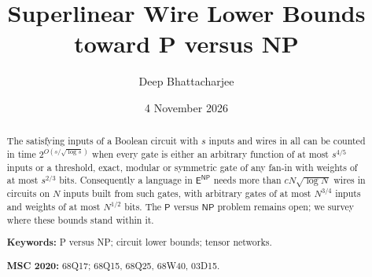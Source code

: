 \documentclass[11pt,reqno]{amsart}
\title[Superlinear wire lower bounds]{Superlinear Wire Lower Bounds toward P versus NP}
\author{Deep Bhattacharjee}
\date{4 November 2026}
\numberwithin{equation}{section}
\theoremstyle{plain}
\theoremstyle{definition}
\theoremstyle{remark}
\newcommand{\Pc}{\mathsf{P}}
\newcommand{\NP}{\mathsf{NP}}
\newcommand{\ENP}{\mathsf{E}^{\mathsf{NP}}}
\begin{document}
\begin{abstract}
The satisfying inputs of a Boolean circuit with $s$ inputs and wires in all
can be counted in time $2^{O(s/\sqrt{\log s})}$ when every gate is either an
arbitrary function of at most $s^{4/5}$ inputs or a threshold, exact, modular or
symmetric gate of any fan-in with weights of at most $s^{2/3}$ bits.
Consequently a language in $\ENP$ needs more than $cN\sqrt{\log N}$ wires in
circuits on $N$ inputs built from such gates, with arbitrary gates of at most
$N^{3/4}$ inputs and weights of at most $N^{1/2}$ bits. The
$\Pc$ versus $\NP$ problem remains open; we survey where these bounds stand
within it.

\medskip
\noindent\textbf{Keywords:} P versus NP; circuit lower bounds; tensor networks.

\noindent\textbf{MSC 2020:} 68Q17; 68Q15, 68Q25, 68W40, 03D15.
\end{abstract}

\maketitle
\setcounter{tocdepth}{1}
\tableofcontents
\end{document}
